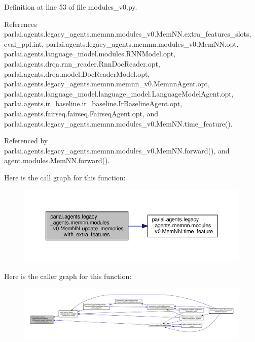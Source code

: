 Definition at line 53 of file modules\+\_\+v0.\+py.



References parlai.\+agents.\+legacy\+\_\+agents.\+memnn.\+modules\+\_\+v0.\+Mem\+N\+N.\+extra\+\_\+features\+\_\+slots, eval\+\_\+ppl.\+int, parlai.\+agents.\+legacy\+\_\+agents.\+memnn.\+modules\+\_\+v0.\+Mem\+N\+N.\+opt, parlai.\+agents.\+language\+\_\+model.\+modules.\+R\+N\+N\+Model.\+opt, parlai.\+agents.\+drqa.\+rnn\+\_\+reader.\+Rnn\+Doc\+Reader.\+opt, parlai.\+agents.\+drqa.\+model.\+Doc\+Reader\+Model.\+opt, parlai.\+agents.\+legacy\+\_\+agents.\+memnn.\+memnn\+\_\+v0.\+Memnn\+Agent.\+opt, parlai.\+agents.\+language\+\_\+model.\+language\+\_\+model.\+Language\+Model\+Agent.\+opt, parlai.\+agents.\+ir\+\_\+baseline.\+ir\+\_\+baseline.\+Ir\+Baseline\+Agent.\+opt, parlai.\+agents.\+fairseq.\+fairseq.\+Fairseq\+Agent.\+opt, and parlai.\+agents.\+legacy\+\_\+agents.\+memnn.\+modules\+\_\+v0.\+Mem\+N\+N.\+time\+\_\+feature().



Referenced by parlai.\+agents.\+legacy\+\_\+agents.\+memnn.\+modules\+\_\+v0.\+Mem\+N\+N.\+forward(), and agent.\+modules.\+Mem\+N\+N.\+forward().

Here is the call graph for this function\+:
\nopagebreak
\begin{figure}[H]
\begin{center}
\leavevmode
\includegraphics[width=350pt]{classparlai_1_1agents_1_1legacy__agents_1_1memnn_1_1modules__v0_1_1MemNN_a9da6ab125898ee1ab3744ee5d260b6dd_cgraph}
\end{center}
\end{figure}
Here is the caller graph for this function\+:
\nopagebreak
\begin{figure}[H]
\begin{center}
\leavevmode
\includegraphics[width=350pt]{classparlai_1_1agents_1_1legacy__agents_1_1memnn_1_1modules__v0_1_1MemNN_a9da6ab125898ee1ab3744ee5d260b6dd_icgraph}
\end{center}
\end{figure}


